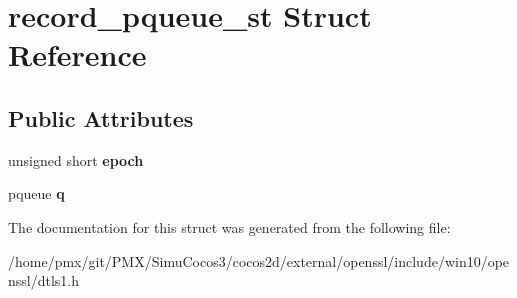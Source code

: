 \hypertarget{structrecord__pqueue__st}{}\section{record\+\_\+pqueue\+\_\+st Struct Reference}
\label{structrecord__pqueue__st}
\subsection*{Public Attributes}
\begin{DoxyCompactItemize}
\item 
\mbox{\label{structrecord__pqueue__st_afac67173059e6a13ddfaad940046c5b4}} 
unsigned short {\bfseries epoch}
\item 
\mbox{\label{structrecord__pqueue__st_a5c5204a38f914cdd4d592cc7d591b83e}} 
pqueue {\bfseries q}
\end{DoxyCompactItemize}


The documentation for this struct was generated from the following file\+:\begin{DoxyCompactItemize}
\item 
/home/pmx/git/\+P\+M\+X/\+Simu\+Cocos3/cocos2d/external/openssl/include/win10/openssl/dtls1.\+h\end{DoxyCompactItemize}
